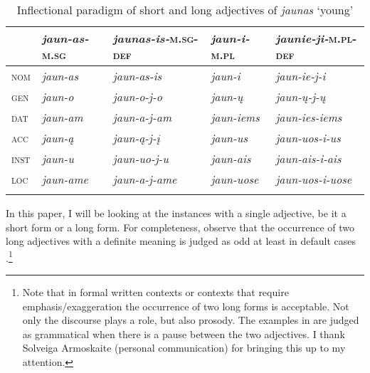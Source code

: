 \documentclass[output=paper,
modfonts
]{langscibook}
\begin{document}
\begin{table} 
	\begin{tabularx}{\textwidth}{p{0.8cm} p{2cm} p{3cm} p{1.9cm} p{2.85cm}}
		\lsptoprule
		{ } & \textit{jaun-as-}\textsc{m.sg} & \textit{jaunas-is-}\textsc{m.sg-def} & \textit{jaun-i-}\textsc{m.pl} & \textit{jaunie-ji-}\textsc{m.pl-def} \\
		\midrule
		\textsc{nom} & \textit{jaun-as}  & \textit{jaun-as-is} & \textit{jaun-i}  & \textit{jaun-ie-j-i} \\ 
		\textsc{gen} & \textit{jaun-o}  & \textit{jaun-o-j-o} & \textit{jaun-ų}  & \textit{jaun-ų-j-ų} \\ 
		\textsc{dat} & \textit{jaun-am} & \textit{jaun-a-j-am} & \textit{jaun-iems}  & \textit{jaun-ies-iems} \\ 
		\textsc{acc} & \textit{jaun-ą} & \textit{jaun-ą-j-į} & \textit{jaun-us} & \textit{jaun-uos-i-us} \\ 
		\textsc{inst} & \textit{jaun-u}  & \textit{jaun-uo-j-u} & \textit{jaun-ais}  & \textit{jaun-ais-i-ais} \\ 
		\textsc{loc} & \textit{jaun-ame} & \textit{jaun-a-j-ame} & \textit{jaun-uose}  & \textit{jaun-uos-i-uose} \\
		\lspbottomrule
	\end{tabularx}
	\caption{Inflectional paradigm of short and long adjectives of \textit{jaunas} `young' \citep[adapted from][]{Stolz2008}}
	\label{tab:sereikaite:1}
\end{table}

In this paper, I will be looking at the instances with a single adjective, be it a short form or a long form. For completeness, observe that the occurrence of two long adjectives with a definite meaning is judged as odd at least in default cases .\footnote{Note that in formal written contexts or contexts that require emphasis/exaggeration the occurrence of two long forms is acceptable. Not only the discourse plays a role, but also prosody. The examples in  are judged as grammatical when there is a pause between the two adjectives. I thank Solveiga Armoskaite (personal communication) for bringing this up to my attention.}\newpage

\begin{exe}
	\ex \label{ex:sereikaite:9}
	\begin{xlist}
	\end{xlist}
\end{exe}
\end{document}
